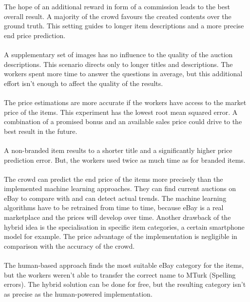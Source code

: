 The hope of an additional reward in form of a commission leads to the best overall result. A majority of the crowd favours the created contents over the ground truth. This setting guides to longer item descriptions and a more precise end price prediction.\\\\
A supplementary set of images has no influence to the quality of the auction descriptions. This scenario directs only to longer titles and descriptions. The workers spent more time to answer the questions in average, but this additional effort isn't enough to affect the quality of the results.\\\\
The price estimations are more accurate if the workers have access to the market price of the items. This experiment has the lowest root mean squared error. A combination of a promised bonus and an available sales price could drive to the best result in the future.\\\\
A non-branded item results to a shorter title and a significantly higher price prediction error. But, the workers used twice as much time as for branded items.\\\\
The crowd can predict the end price of the items more precisely than the implemented machine learning approaches. They can find current auctions on eBay to compare with and can detect actual trends. The machine learning algorithms have to be retrained from time to time, because eBay is a real marketplace and the prices will develop over time. Another drawback of the hybrid idea is the specialisation in specific item categories, a certain smartphone model for example. The price advantage of the implementation is negligible in comparison with the accuracy of the crowd.\\\\
The human-based approach finds the most suitable eBay category for the items, but the workers weren't able to transfer the correct name to MTurk (Spelling errors). The hybrid solution can be done for free, but the resulting category isn't as precise as the human-powered implementation.
